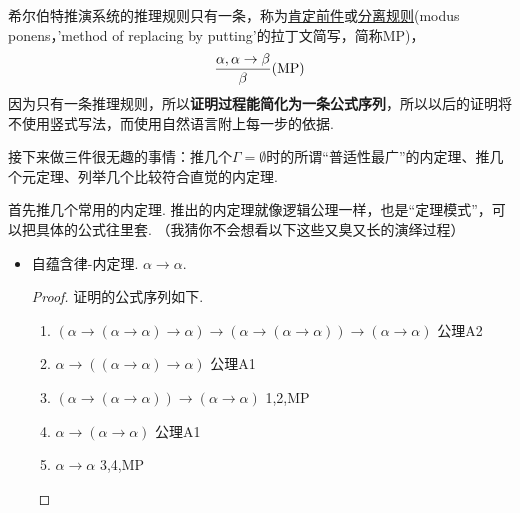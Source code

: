 希尔伯特推演系统的推理规则只有一条，称为\underline{肯定前件}或\underline{分离规则}(modus ponens，'method of replacing by putting'的拉丁文简写，简称MP)，
\[{\alpha, \alpha \to \beta \over \beta}({\rm MP})\]
因为只有一条推理规则，所以\textbf{证明过程能简化为一条公式序列}，所以以后的证明将不使用竖式写法，而使用自然语言附上每一步的依据.

接下来做三件很无趣的事情：推几个\(\Gamma=\emptyset\)时的所谓“普适性最广”的内定理、推几个元定理、列举几个比较符合直觉的内定理.


首先推几个常用的内定理. 推出的内定理就像逻辑公理一样，也是“定理模式”，可以把具体的公式往里套. （我猜你不会想看以下这些又臭又长的演绎过程）
\begin{itemize}

    \item 自蕴含律-内定理. \(\alpha \to \alpha\).
    \begin{proof}
        证明的公式序列如下.
        \begin{enumerate}
            \item \((\alpha \to (\alpha \to \alpha) \to \alpha) \to (\alpha \to (\alpha \to \alpha)) \to (\alpha \to \alpha)\) \hfill 公理A2
            \item \(\alpha \to ((\alpha \to \alpha) \to \alpha)\) \hfill 公理A1
            \item \((\alpha \to (\alpha \to \alpha)) \to (\alpha \to \alpha)\) \hfill 1,2,MP
            \item \(\alpha \to (\alpha \to \alpha)\) \hfill 公理A1
            \item \(\alpha \to \alpha\) \hfill 3,4,MP
        \end{enumerate}
    \end{proof}


\end{itemize}
